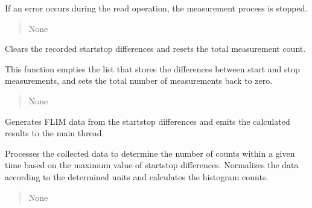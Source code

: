 \documentclass[letterpaper,10pt,english]{sphinxmanual}
\begin{document}
\begin{fulllineitems}
\begin{fulllineitems}
\sphinxAtStartPar
If an error occurs during the read operation, the measurement process is stopped.
\begin{quote}\begin{description}
\sphinxAtStartPar
None

\end{description}\end{quote}

\end{fulllineitems}


\begin{fulllineitems}
\label{\detokenize{FLIMGraphics:FLIMGraphics.WorkerThreadFLIM.clear}}
\pysigstartsignatures
{}
\pysigstopsignatures
\sphinxAtStartPar
Clears the recorded start\sphinxhyphen{}stop differences and resets the total measurement count.

\sphinxAtStartPar
This function empties the list that stores the differences between start and stop measurements,
and sets the total number of measurements back to zero.
\begin{quote}\begin{description}
\sphinxAtStartPar
None

\end{description}\end{quote}

\end{fulllineitems}


\begin{fulllineitems}
\label{\detokenize{FLIMGraphics:FLIMGraphics.WorkerThreadFLIM.createFLIMData}}
\pysigstartsignatures
{}
\pysigstopsignatures
\sphinxAtStartPar
Generates FLIM data from the start\sphinxhyphen{}stop differences and emits the calculated results to the main thread.

\sphinxAtStartPar
Processes the collected data to determine the number of counts within a given time based on the maximum value of start\sphinxhyphen{}stop differences.
Normalizes the data according to the determined units and calculates the histogram counts.
\begin{quote}\begin{description}
\sphinxAtStartPar
None


\end{description}
\end{quote}
\end{fulllineitems}
\end{fulllineitems}
\end{document}
